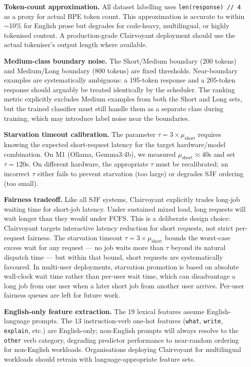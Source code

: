 \documentclass[10pt,letterpaper]{article}
\begin{document}
\textbf{Token-count approximation.} All dataset labelling uses \texttt{len(response) // 4} as a proxy for actual BPE token count. This approximation is accurate to within ${\sim}$10\% for English prose but degrades for code-heavy, multilingual, or highly tokenised content. A production-grade Clairvoyant deployment should use the actual tokeniser's output length where available.

\textbf{Medium-class boundary noise.} The Short/Medium boundary (200 tokens) and Medium/Long boundary (800 tokens) are fixed thresholds. Near-boundary examples are systematically ambiguous: a 195-token response and a 205-token response should arguably be treated identically by the scheduler. The ranking metric explicitly excludes Medium examples from both the Short and Long sets, but the trained classifier must still handle them as a separate class during training, which may introduce label noise near the boundaries.

\textbf{Starvation timeout calibration.} The parameter $\tau = 3 \times \mu_{\text{short}}$ requires knowing the expected short-request latency for the target hardware/model combination. On M1 (Ollama, Gemma3:4b), we measured $\mu_{\text{short}} \approx 40$s and set $\tau = 120$s. On different hardware, the appropriate $\tau$ must be recalibrated; an incorrect $\tau$ either fails to prevent starvation (too large) or degrades SJF ordering (too small).

\textbf{Fairness tradeoff.} Like all SJF systems, Clairvoyant explicitly trades long-job waiting time for short-job latency. Under sustained mixed load, long requests will wait longer than they would under FCFS. This is a deliberate design choice: Clairvoyant targets interactive latency reduction for short requests, not strict per-request fairness. The starvation timeout $\tau = 3 \times \mu_\text{short}$ bounds the worst-case excess wait for any request --- no job waits more than $\tau$ beyond its natural dispatch time --- but within that bound, short requests are systematically favoured. In multi-user deployments, starvation promotion is based on absolute wall-clock wait time rather than per-user wait time, which can disadvantage a long job from one user when a later short job from another user arrives. Per-user fairness queues are left for future work.

\textbf{English-only feature extraction.} The 19 lexical features assume English-language prompts. The 13 instruction-verb one-hot features (\texttt{what}, \texttt{write}, \texttt{explain}, etc.) are English-only; non-English prompts will always resolve to the \texttt{other} verb category, degrading predictor performance to near-random ordering for non-English workloads. Organisations deploying Clairvoyant for multilingual workloads should retrain with language-appropriate feature sets.
\end{document}
